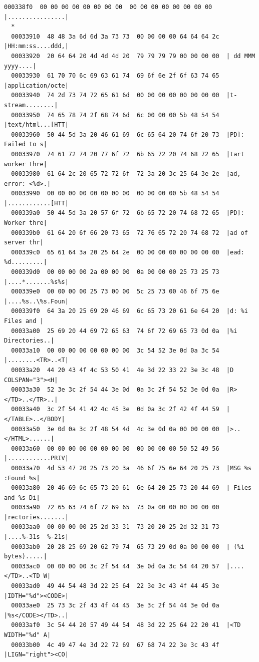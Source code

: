 \documentclass[]{project_plan}
\begin{document}
\begin{lstlisting}[basicstyle=\tiny]
  000338f0  00 00 00 00 00 00 00 00  00 00 00 00 00 00 00 00  |................|
  *
  00033910  48 48 3a 6d 6d 3a 73 73  00 00 00 00 64 64 64 2c  |HH:mm:ss....ddd,|
  00033920  20 64 64 20 4d 4d 4d 20  79 79 79 79 00 00 00 00  | dd MMM yyyy....|
  00033930  61 70 70 6c 69 63 61 74  69 6f 6e 2f 6f 63 74 65  |application/octe|
  00033940  74 2d 73 74 72 65 61 6d  00 00 00 00 00 00 00 00  |t-stream........|
  00033950  74 65 78 74 2f 68 74 6d  6c 00 00 00 5b 48 54 54  |text/html...[HTT|
  00033960  50 44 5d 3a 20 46 61 69  6c 65 64 20 74 6f 20 73  |PD]: Failed to s|
  00033970  74 61 72 74 20 77 6f 72  6b 65 72 20 74 68 72 65  |tart worker thre|
  00033980  61 64 2c 20 65 72 72 6f  72 3a 20 3c 25 64 3e 2e  |ad, error: <%d>.|
  00033990  00 00 00 00 00 00 00 00  00 00 00 00 5b 48 54 54  |............[HTT|
  000339a0  50 44 5d 3a 20 57 6f 72  6b 65 72 20 74 68 72 65  |PD]: Worker thre|
  000339b0  61 64 20 6f 66 20 73 65  72 76 65 72 20 74 68 72  |ad of server thr|
  000339c0  65 61 64 3a 20 25 64 2e  00 00 00 00 00 00 00 00  |ead: %d.........|
  000339d0  00 00 00 00 2a 00 00 00  0a 00 00 00 25 73 25 73  |....*.......%s%s|
  000339e0  00 00 00 00 25 73 00 00  5c 25 73 00 46 6f 75 6e  |....%s..\%s.Foun|
  000339f0  64 3a 20 25 69 20 46 69  6c 65 73 20 61 6e 64 20  |d: %i Files and |
  00033a00  25 69 20 44 69 72 65 63  74 6f 72 69 65 73 0d 0a  |%i Directories..|
  00033a10  00 00 00 00 00 00 00 00  3c 54 52 3e 0d 0a 3c 54  |........<TR>..<T|
  00033a20  44 20 43 4f 4c 53 50 41  4e 3d 22 33 22 3e 3c 48  |D COLSPAN="3"><H|
  00033a30  52 3e 3c 2f 54 44 3e 0d  0a 3c 2f 54 52 3e 0d 0a  |R></TD>..</TR>..|
  00033a40  3c 2f 54 41 42 4c 45 3e  0d 0a 3c 2f 42 4f 44 59  |</TABLE>..</BODY|
  00033a50  3e 0d 0a 3c 2f 48 54 4d  4c 3e 0d 0a 00 00 00 00  |>..</HTML>......|
  00033a60  00 00 00 00 00 00 00 00  00 00 00 00 50 52 49 56  |............PRIV|
  00033a70  4d 53 47 20 25 73 20 3a  46 6f 75 6e 64 20 25 73  |MSG %s :Found %s|
  00033a80  20 46 69 6c 65 73 20 61  6e 64 20 25 73 20 44 69  | Files and %s Di|
  00033a90  72 65 63 74 6f 72 69 65  73 0a 00 00 00 00 00 00  |rectories.......|
  00033aa0  00 00 00 00 25 2d 33 31  73 20 20 25 2d 32 31 73  |....%-31s  %-21s|
  00033ab0  20 28 25 69 20 62 79 74  65 73 29 0d 0a 00 00 00  | (%i bytes).....|
  00033ac0  00 00 00 00 3c 2f 54 44  3e 0d 0a 3c 54 44 20 57  |....</TD>..<TD W|
  00033ad0  49 44 54 48 3d 22 25 64  22 3e 3c 43 4f 44 45 3e  |IDTH="%d"><CODE>|
  00033ae0  25 73 3c 2f 43 4f 44 45  3e 3c 2f 54 44 3e 0d 0a  |%s</CODE></TD>..|
  00033af0  3c 54 44 20 57 49 44 54  48 3d 22 25 64 22 20 41  |<TD WIDTH="%d" A|
  00033b00  4c 49 47 4e 3d 22 72 69  67 68 74 22 3e 3c 43 4f  |LIGN="right"><CO|
\end{lstlisting}
\end{document}
